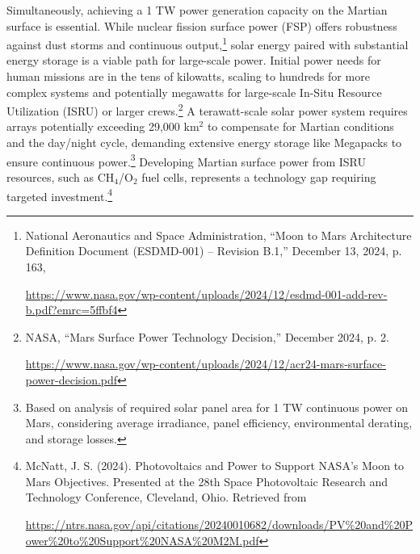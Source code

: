 \documentclass[fontsize=10pt, oneside, DIV=calc]{scrartcl}
\begin{document}
\medskip

\noindent
Simultaneously, achieving a 1 TW power generation capacity on the Martian surface is essential. While nuclear fission surface power (FSP) offers robustness against dust storms and continuous output,\footnote{National Aeronautics and Space Administration, ``Moon to Mars Architecture Definition Document (ESDMD-001) – Revision B.1,'' December 13, 2024, p. 163,








\href{https://www.nasa.gov/wp-content/uploads/2024/12/esdmd-001-add-rev-b.pdf?emrc=5ffbf4}\url{https://www.nasa.gov/wp-content/uploads/2024/12/esdmd-001-add-rev-b.pdf?emrc=5ffbf4}} solar energy paired with substantial energy storage is a viable path for large-scale power. Initial power needs for human missions are in the tens of kilowatts, scaling to hundreds for more complex systems and potentially megawatts for large-scale In-Situ Resource Utilization (ISRU) or larger crews.\footnote{NASA, ``Mars Surface Power Technology Decision,'' December 2024, p. 2.








\href{https://www.nasa.gov/wp-content/uploads/2024/12/acr24-mars-surface-power-decision.pdf}\url{https://www.nasa.gov/wp-content/uploads/2024/12/acr24-mars-surface-power-decision.pdf}} A terawatt-scale solar power system requires arrays potentially exceeding 29,000 km$^2$ to compensate for Martian conditions and the day/night cycle, demanding extensive energy storage like Megapacks to ensure continuous power.\footnote{Based on analysis of required solar panel area for 1 TW continuous power on Mars, considering average irradiance, panel efficiency, environmental derating, and storage losses.} Developing Martian surface power from ISRU resources, such as CH\(_4\)/O\(_2\) fuel cells, represents a technology gap requiring targeted investment.\footnote{McNatt, J. S. (2024). Photovoltaics and Power to Support NASA’s Moon to Mars Objectives. Presented at the 28th Space Photovoltaic Research and Technology Conference, Cleveland, Ohio. Retrieved from








\href{https://ntrs.nasa.gov/api/citations/20240010682/downloads/PV\%20and\%20Power\%20to\%20Support\%20NASA\%20M2M.pdf}\url{https://ntrs.nasa.gov/api/citations/20240010682/downloads/PV\%20and\%20Power\%20to\%20Support\%20NASA\%20M2M.pdf}}
\end{document}
